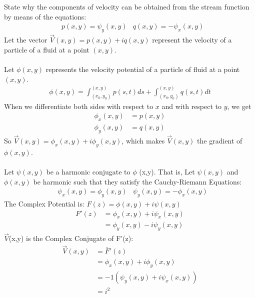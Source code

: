 \documentclass[12pt]{article}
\begin{document}
State why the components of velocity can be obtained from the stream function by means of the equations:
\begin{align}
& p(x,y) = \psi_y(x,y) 
& q(x,y) = -\psi_x(x,y)
\end{align}
Let the vector $\vec{V}(x,y) = p(x,y) + iq(x,y) $ represent the velocity of a particle of a fluid at a point $(x,y)$.
\\\\
Let $\phi (x,y) $ represents the velocity potential of a particle of fluid at a point $(x,y)$.
\begin{align}
\phi (x,y) = \int_{(x_0,y_0)}^{(x,y)} p(s,t) ds + \int_{(x_0,y_0)}^{(x,y)} q(s,t) dt
\end{align}
When we differentiate both sides with respect to $x$ and with respect to $y$, we get 
\begin{align}
\phi_x (x,y) &= p(x,y)
\\
\phi_y (x,y) &= q(x,y)
\end{align}
So $\vec{V} (x,y) = \phi _x (x,y) + i \phi_y (x,y)$, which makes $\vec{V}(x,y)$ the gradient of $\phi (x,y)$.
\\\\
Let $\psi (x,y)$ be a harmonic conjugate to $\phi$ (x,y). That is, Let $\psi (x,y)$ and $\phi(x,y)$ be harmonic such that they satisfy the Cauchy-Riemann Equations: 
\begin{align}
&\psi_x(x,y) = \phi_y(x,y) 
&\psi_y(x,y) = -\phi_x(x,y) 
\end{align}
The Complex Potential is: $F(z) = \phi(x,y) + i\psi(x,y) $
\begin{align}
F'(z) &= \phi_x (x,y) + i\psi_x(x,y)
\\
&= \phi_y (x,y) - i\psi_y(x,y)
\end{align}
$\vec{V}$(x,y) is the Complex Conjugate of F'(z):
\begin{align}
\vec{V}(x,y) &= \bar{F}'(z)
\\
&= \phi_x(x,y) + i \phi_y(x,y)
\\
&= -1(\psi_y(x,y) + i\psi_x(x,y))
\\
&= i^2
\end{align}
\end{document}
